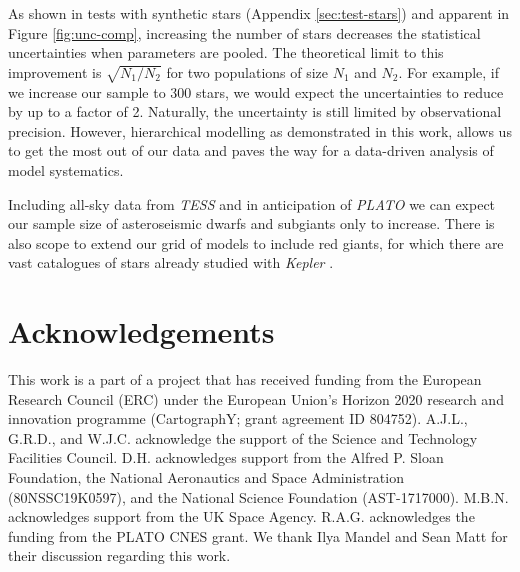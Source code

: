 \documentclass[a4paper,fleqn,usenatbib]{mnras}
\begin{document}
As shown in tests with synthetic stars (Appendix \ref{sec:test-stars}) and apparent in Figure \ref{fig:unc-comp}, increasing the number of stars decreases the statistical uncertainties when parameters are pooled. The theoretical limit to this improvement is $\sqrt{N_1 / N_2}$ for two populations of size $N_1$ and $N_2$. For example, if we increase our sample to 300 stars, we would expect the uncertainties to reduce by up to a factor of 2. Naturally, the uncertainty is still limited by observational precision. However, hierarchical modelling as demonstrated in this work, allows us to get the most out of our data and paves the way for a data-driven analysis of model systematics.

Including all-sky data from \emph{TESS} and in anticipation of \emph{PLATO} \citep{Rauer.Catala.ea2014} we can expect our sample size of asteroseismic dwarfs and subgiants only to increase. There is also scope to extend our grid of models to include red giants, for which there are vast catalogues of stars already studied with \emph{Kepler} \citep{Pinsonneault.Elsworth.ea2018}.

\section*{Acknowledgements}


This work is a part of a project that has received funding from the European Research Council (ERC) under the European Union’s Horizon 2020 research and innovation programme (CartographY; grant agreement ID 804752). A.J.L., G.R.D.,  and W.J.C. acknowledge the support of the Science and Technology Facilities Council. D.H. acknowledges support from the Alfred P. Sloan Foundation, the National Aeronautics and Space Administration (80NSSC19K0597), and the National Science Foundation (AST-1717000). M.B.N. acknowledges support from the UK Space Agency. R.A.G. acknowledges the funding from the PLATO CNES grant. We thank Ilya Mandel and Sean Matt for their discussion regarding this work.





\end{document}
